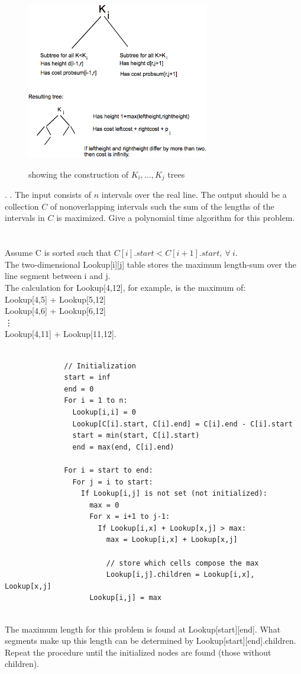 \documentclass[10pt]{article}
\begin{document}
		\begin{figure}[h]
			\centering
				\includegraphics[width=300px]{dyn10.png}
			\label{fig:dyn10}
			\caption{showing the construction of $K_i, \ldots, K_j$ trees}
		\end{figure}
	\newpage
	.
	\newpage
	.	The input consists of $n$ intervals over the real line. The output should be a collection $C$  of nonoverlapping 
			intervals such the sum of the lengths of the intervals in $C$ is maximized. Give a polynomial
			time algorithm for this problem.\\
			\\
			\\
		  Assume C is sorted such that $C[i].start < C[i+1].start, ~\forall~i$.\\
		  The two-dimensional Lookup[i][j] table stores the maximum length-sum
		  over the line segment between i and j.\\
		  The calculation for Lookup[4,12], for example, is the maximum of:\\
		  Lookup[4,5] + Lookup[5,12]\\
		  Lookup[4,6] + Lookup[6,12]\\
		  \vdots\\
		  Lookup[4,11] + Lookup[11,12].\\
			\\
			\begin{verbatim}
			  // Initialization
			  start = inf
			  end = 0
			  For i = 1 to n:
			    Lookup[i,i] = 0
			    Lookup[C[i].start, C[i].end] = C[i].end - C[i].start
			    start = min(start, C[i].start)
			    end = max(end, C[i].end)
			  
			  For i = start to end:
			    For j = i to start:
			      If Lookup[i,j] is not set (not initialized):
			        max = 0
			        For x = i+1 to j-1:
			          If Lookup[i,x] + Lookup[x,j] > max:
			            max = Lookup[i,x] + Lookup[x,j]
			            
			            // store which cells compose the max
			            Lookup[i,j].children = Lookup[i,x], Lookup[x,j] 
			        Lookup[i,j] = max
			\end{verbatim}
			\\
			The maximum length for this problem is found at Lookup[start][end]. What 
			segments make up this length can be determined by Lookup[start][end].children.
			Repeat the procedure until the initialized nodes are found (those without children). 
\end{document}

